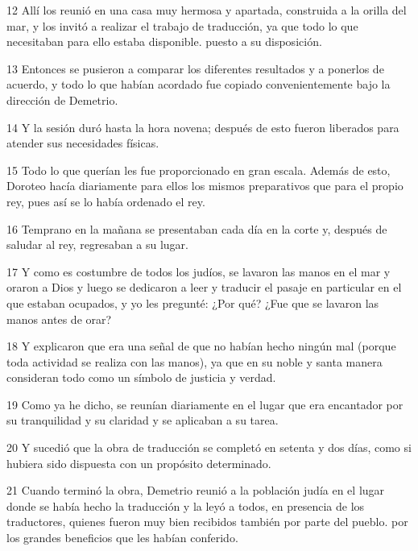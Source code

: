 \par 12 Allí los reunió en una casa muy hermosa y apartada, construida a la orilla del mar, y los invitó a realizar el trabajo de traducción, ya que todo lo que necesitaban para ello estaba disponible. puesto a su disposición.

\par 13 Entonces se pusieron a comparar los diferentes resultados y a ponerlos de acuerdo, y todo lo que habían acordado fue copiado convenientemente bajo la dirección de Demetrio.

\par 14 Y la sesión duró hasta la hora novena; después de esto fueron liberados para atender sus necesidades físicas.

\par 15 Todo lo que querían les fue proporcionado en gran escala. Además de esto, Doroteo hacía diariamente para ellos los mismos preparativos que para el propio rey, pues así se lo había ordenado el rey.

\par 16 Temprano en la mañana se presentaban cada día en la corte y, después de saludar al rey, regresaban a su lugar.

\par 17 Y como es costumbre de todos los judíos, se lavaron las manos en el mar y oraron a Dios y luego se dedicaron a leer y traducir el pasaje en particular en el que estaban ocupados, y yo les pregunté: ¿Por qué? ¿Fue que se lavaron las manos antes de orar?

\par 18 Y explicaron que era una señal de que no habían hecho ningún mal (porque toda actividad se realiza con las manos), ya que en su noble y santa manera consideran todo como un símbolo de justicia y verdad.

\par 19 Como ya he dicho, se reunían diariamente en el lugar que era encantador por su tranquilidad y su claridad y se aplicaban a su tarea.

\par 20 Y sucedió que la obra de traducción se completó en setenta y dos días, como si hubiera sido dispuesta con un propósito determinado.

\par 21 Cuando terminó la obra, Demetrio reunió a la población judía en el lugar donde se había hecho la traducción y la leyó a todos, en presencia de los traductores, quienes fueron muy bien recibidos también por parte del pueblo. por los grandes beneficios que les habían conferido.

